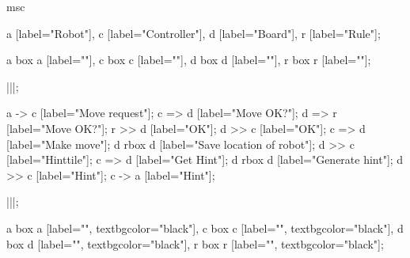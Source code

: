 \begin{msc}
msc
{

a [label="Robot"],
c [label="Controller"],
d [label="Board"],
r [label="Rule"];

a box a [label=""],
c box c [label=""],
d box d [label=""],
r box r [label=""];

|||;

a -> c [label="Move request"];
c => d [label="Move OK?"];
d => r [label="Move OK?"];
r >> d [label="OK"];
d >> c [label="OK"];
c => d [label="Make move"];
d rbox d [label="Save location of robot"];
d >> c [label="Hinttile"];
c => d [label="Get Hint"];
d rbox d [label="Generate hint"];
d >> c [label="Hint"];
c -> a [label="Hint"];

|||;

a box a [label="", textbgcolor="black"],
c box c [label="", textbgcolor="black"],
d box d [label="", textbgcolor="black"],
r box r [label="", textbgcolor="black"];

}
\end{msc}
